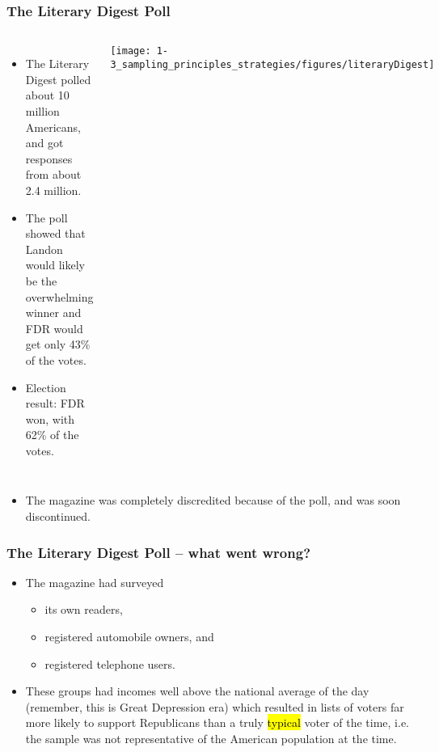
\begin{frame}
\frametitle{The Literary Digest Poll}

\begin{columns}


\begin{itemize}

\item The Literary Digest polled about 10 million Americans, and got responses from about 2.4 million.

\item The poll showed that Landon would likely be the overwhelming winner and FDR would get only 43\% of the votes.

\item Election result:  FDR won, with 62\% of the votes.

\end{itemize}


\texttt{[image: 1-3\_sampling\_principles\_strategies/figures/literaryDigest]}

\end{columns}

\begin{itemize}

\item The magazine was completely discredited because of the poll, and was soon discontinued.

\end{itemize}

\end{frame}


\begin{frame}
\frametitle{The Literary Digest Poll -- what went wrong?}

\begin{itemize}

\item The magazine had surveyed

\begin{itemize}

\item its own readers,

\item registered automobile owners, and

\item registered telephone users.

\end{itemize}

\item These groups had incomes well above the national average of the day (remember, this is Great Depression era) which resulted in lists of voters far more likely to support Republicans than a truly \hl{typical} voter of the time, i.e. the sample was not representative of the American population at the time.

\end{itemize}

\end{frame}

